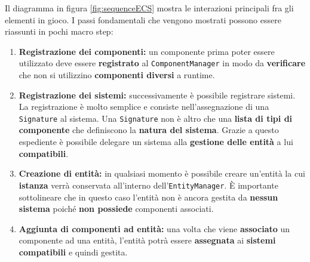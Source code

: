 Il diagramma in figura \ref{fig:sequenceECS} mostra le interazioni principali fra gli elementi in gioco. I passi fondamentali che vengono mostrati possono essere riassunti in pochi macro step:
\begin{enumerate}
	\item{\textbf{Registrazione dei componenti:}} un componente prima poter essere utilizzato deve essere \textbf{registrato} al \texttt{ComponentManager} in modo da \textbf{verificare} che non si utilizzino \textbf{componenti diversi} a runtime.
	\item{\textbf{Registrazione dei sistemi:}} successivamente è possibile registrare sistemi. La registrazione è molto semplice e consiste nell'assegnazione di una \texttt{Signature} al sistema. Una \texttt{Signature} non è altro che una \textbf{lista di tipi di componente} che definiscono la \textbf{natura del sistema}. Grazie a questo espediente è possibile delegare un sistema alla \textbf{gestione delle entità} a lui \textbf{compatibili}.
	\item{\textbf{Creazione di entità:}} in qualsiasi momento è possibile creare un'entità la cui \textbf{istanza} verrà conservata all'interno dell'\texttt{EntityManager}. È importante sottolineare che in questo caso l'entità non è ancora gestita da \textbf{nessun sistema} poiché \textbf{non possiede} componenti associati.
	\item{\textbf{Aggiunta di componenti ad entità:}} una volta che viene \textbf{associato} un componente ad una entità, l'entità potrà essere \textbf{assegnata} ai \textbf{sistemi compatibili} e quindi gestita.
\end{enumerate}
